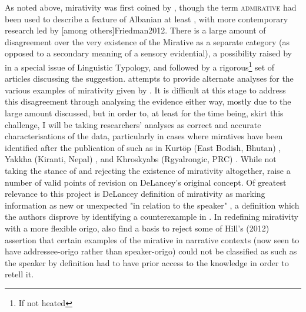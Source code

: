As noted above, mirativity was first coined by , though the term \textsc{admirative} had been used to describe a feature of Albanian at least , with more contemporary research led by [among others]{Friedman2012}. There is a large amount of disagreement over the very existence of the Mirative as a separate category (as opposed to a secondary meaning of a sensory evidential), a possibility raised by  in a special issue of Linguistic Typology, and followed by a rigorous\footnote{If not heated} set of articles discussing the suggestion.  attempts to provide alternate analyses for the various examples of mirativity given by . It is difficult at this stage to address this disagreement through analysing the evidence either way, mostly due to the large amount discussed, but in order to, at least for the time being, skirt this challenge, I will be taking researchers' analyses as correct and accurate characterisations of the data, particularly in cases where miratives have been identified after the publication of  such as in Kurtöp (East Bodish, Bhutan) \cite{Hyslop2017}, Yakkha (Kiranti, Nepal) \cite{Schackow2015}, and Khroskyabs (Rgyalrongic, PRC) \cites{Lai2017}{TaylorAdams2020}. While not taking the stance of  and rejecting the existence of mirativity altogether,  raise a number of valid points of revision on DeLancey's original concept. Of greatest relevance to this project is DeLancey definition of mirativity as marking information as new or unexpected "in relation to the speaker" \cite[488]{HengeveldOlbertz2012}, a definition which the authors disprove by identifying a counterexample in . In redefining mirativity with a more flexible origo,  also find a basis to reject some of Hill's (2012) assertion that certain examples of the mirative in narrative contexts (now seen to have addressee-origo rather than speaker-origo) could not be classified as such as the speaker by definition had to have prior access to the knowledge in order to retell it.


